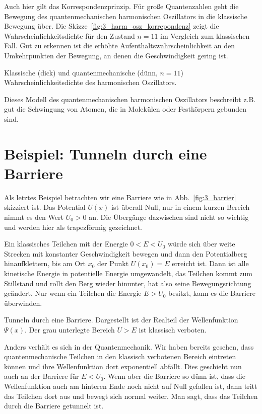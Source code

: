 Auch hier gilt das Korrespondenzprinzip. Für große Quantenzahlen geht die Bewegung des quantenmechanischen harmonischen Oszillators in die klassische Bewegung über. Die Skizze~\ref{fig:3_harm_osz_korrepondenz} zeigt die Wahrscheinlichkeitsdichte für den Zustand $n=11$ im Vergleich zum klassischen Fall. Gut zu erkennen ist die erhöhte Aufenthaltswahrscheinlichkeit an den Umkehrpunkten der Bewegung, an denen die Geschwindigkeit gering ist.

\begin{marginfigure}
    \caption{Klassische (dick) und quantenmechanische (dünn, $n=11$) Wahrscheinlichkeitsdichte des harmonischen Oszillators.}
    \label{fig:3_harm_osz_korrepondenz}
\end{marginfigure}

Dieses Modell des quantenmechanischen harmonischen Oszillators beschreibt z.B. gut die Schwingung von Atomen, die in Molekülen oder Festkörpern gebunden sind.

\section{Beispiel: Tunneln durch eine Barriere}

Als letztes Beispiel betrachten wir eine Barriere wie in Abb.~\ref{fig:3_barrier} skizziert ist. Das Potential $U(x)$ ist überall Null, nur in einem kurzen Bereich nimmt es den Wert $U_0 > 0$ an. Die Übergänge dazwischen sind nicht so wichtig und werden hier als trapezförmig gezeichnet.

Ein klassisches Teilchen mit der Energie $0 < E < U_0$ würde sich über weite Strecken mit konstanter Geschwindigkeit bewegen und dann den Potentialberg hinaufklettern, bis am Ort $x_0$ der Punkt $U(x_0) = E$ erreicht ist. Dann ist alle kinetische Energie in potentielle Energie umgewandelt, das Teilchen kommt zum Stillstand und rollt den Berg wieder hinunter, hat also seine Bewegungsrichtung geändert. Nur wenn ein Teilchen die Energie $E > U_0$ besitzt, kann es die Barriere überwinden.

\begin{marginfigure}
    \caption{Tunneln durch eine Barriere. Dargestellt ist der Realteil der Wellenfunktion $\Psi(x)$. Der grau unterlegte Bereich $U > E$ ist klassisch verboten.}
    \label{fig:3_barrier}
\end{marginfigure}


Anders verhält es sich in der Quantenmechanik. Wir haben bereits gesehen, dass quantenmechanische Teilchen in den klassisch verbotenen Bereich eintreten können und ihre Wellenfunktion dort exponentiell abfällt. Dies geschieht nun auch an der Barriere für $E < U_0$. Wenn aber die Barriere so dünn ist, dass die Wellenfunktion auch am hinteren Ende noch nicht auf Null gefallen ist, dann tritt das Teilchen dort aus und bewegt sich normal weiter. Man sagt, dass das Teilchen durch die Barriere getunnelt ist. 

